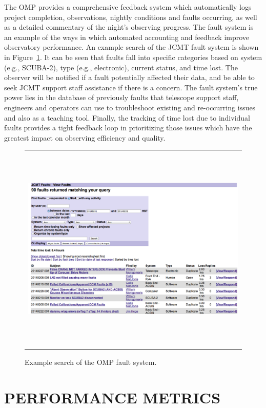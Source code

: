 \documentclass[]{spie}  %
\begin{document}
The OMP provides a comprehensive feedback system which automatically
logs project completion, observations, nightly conditions and faults
occurring, as well as a detailed commentary of the night's observing
progress. The fault system is an example of the ways in which
automated accounting and feedback improve observatory performance. An
example search of the JCMT fault system is shown in
Figure~\ref{fig:faulteg}. It can be seen that faults fall into
specific categories based on system (e.g., SCUBA-2), type (e.g.,
electronic), current status, and time lost. The observer will be
notified if a fault potentially affected their data, and be able to
seek JCMT support staff assistance if there is a concern. The fault
system's true power lies in the database of previously faults that
telescope support staff, engineers and operators can use to
troubleshoot existing and re-occurring issues and also as a teaching
tool. Finally, the tracking of time lost due to individual faults
provides a tight feedback loop in prioritizing those issues which have
the greatest impact on observing efficiency and quality.

 \begin{figure}[ht]
   \begin{center}
   \begin{tabular}{c}
   \includegraphics[height=10cm]{faultexample}
   \end{tabular}
   \end{center}
   \caption{\label{fig:faulteg}Example search of the OMP fault system.}
\end{figure}


\section{PERFORMANCE METRICS} \label{sec:metrics}
\end{document}
